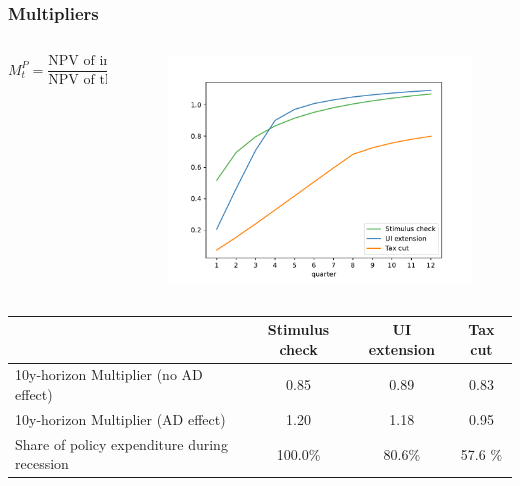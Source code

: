 \documentclass[pdflatex,aspectratio=169, handout]{beamer}
\begin{document}
\begin{frame}
\frametitle{Multipliers}

    \begin{columns}

      \begin{column}{0.50\textwidth}
        \begin{equation*}
          M^P_t = \frac{\text{NPV of induced consumption up to $t$}}{\text{NPV of the cost of the policy}}
        \end{equation*}
      \end{column}

      \begin{column}{0.50\textwidth}

        \begin{figure}[t]
          \centering
          \includegraphics[width=\linewidth]{Code/HA-Models/FromPandemicCode/Figures/Cummulative_multipliers}
        \end{figure}

      \end{column}
    \end{columns}

    \begin{table}[t]
      \begin{tabular}{@{}lccc@{}} 
        \toprule 
        & Stimulus check    & UI extension    & Tax cut     \\  \midrule 
        10y-horizon Multiplier (no AD effect) &0.85  & 0.89  & 0.83     \\ 
        10y-horizon Multiplier (AD effect) &1.20  & 1.18  & 0.95     \\ 
Share of policy expenditure during recession &100.0\%  & 80.6\%  & 57.6 \%    \\ 
\end{tabular}  
\end{table}
\end{frame}
\end{document}
